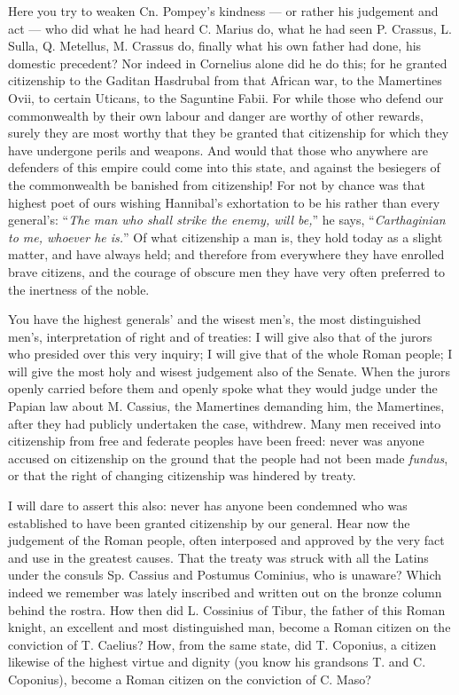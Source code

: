  Here you try to weaken Cn. Pompey's kindness --- or rather his judgement and act --- who did what he had heard C. Marius do, what he had seen P. Crassus, L. Sulla, Q. Metellus, M. Crassus do, finally what his own father had done, his domestic precedent? Nor indeed in Cornelius alone did he do this; for he granted citizenship to the Gaditan Hasdrubal from that African war, to the Mamertines Ovii, to certain Uticans, to the Saguntine Fabii. For while those who defend our commonwealth by their own labour and danger are worthy of other rewards, surely they are most worthy that they be granted that citizenship for which they have undergone perils and weapons. And would that those who anywhere are defenders of this empire could come into this state, and against the besiegers of the commonwealth be banished from citizenship! For not by chance was that highest poet of ours wishing Hannibal's exhortation to be his rather than every general's: ``\textit{The man who shall strike the enemy, will be,}'' he says, ``\textit{Carthaginian to me, whoever he is.}'' Of what citizenship a man is, they hold today as a slight matter, and have always held; and therefore from everywhere they have enrolled brave citizens, and the courage of obscure men they have very often preferred to the inertness of the noble.

 You have the highest generals' and the wisest men's, the most distinguished men's, interpretation of right and of treaties: I will give also that of the jurors who presided over this very inquiry; I will give that of the whole Roman people; I will give the most holy and wisest judgement also of the Senate. When the jurors openly carried before them and openly spoke what they would judge under the Papian law about M. Cassius, the Mamertines demanding him, the Mamertines, after they had publicly undertaken the case, withdrew. Many men received into citizenship from free and federate peoples have been freed: never was anyone accused on citizenship on the ground that the people had not been made \textit{fundus}, or that the right of changing citizenship was hindered by treaty.

 I will dare to assert this also: never has anyone been condemned who was established to have been granted citizenship by our general. Hear now the judgement of the Roman people, often interposed and approved by the very fact and use in the greatest causes. That the treaty was struck with all the Latins under the consuls Sp. Cassius and Postumus Cominius, who is unaware? Which indeed we remember was lately inscribed and written out on the bronze column behind the rostra. How then did L. Cossinius of Tibur, the father of this Roman knight, an excellent and most distinguished man, become a Roman citizen on the conviction of T. Caelius? How, from the same state, did T. Coponius, a citizen likewise of the highest virtue and dignity (you know his grandsons T. and C. Coponius), become a Roman citizen on the conviction of C. Maso?

